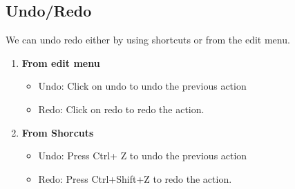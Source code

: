 \subsection{Undo/Redo}
We can undo redo either by using shortcuts or from the edit menu.
\begin{enumerate}
\item \textbf{From edit menu}
\begin{itemize}
\item Undo: Click on undo to undo the previous action
\item Redo: Click on redo to redo the action.
\end{itemize}
\item \textbf{From Shorcuts}
\begin{itemize}
\item Undo: Press Ctrl+ Z to undo the previous action
\item Redo: Press Ctrl+Shift+Z to redo the action.
\end{itemize}
\end{enumerate}